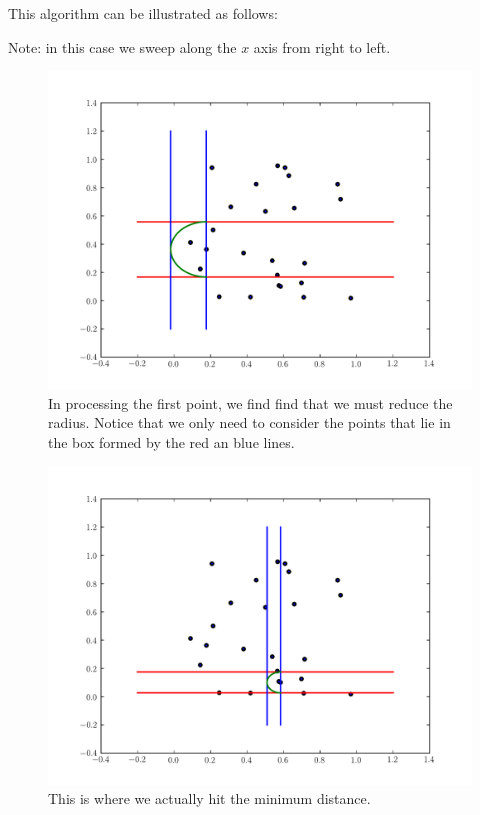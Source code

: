 This algorithm can be illustrated as follows:

Note: in this case we sweep along the $x$ axis from right to left.

\begin{figure}[H]
\includegraphics[width = \textwidth]{sweep0.pdf}
\caption{In processing the first point, we find find that we must reduce the radius.
Notice that we only need to consider the points that lie in the box formed by the red an blue lines.}
\end{figure}

\begin{figure}[H]
\includegraphics[width = \textwidth]{sweep13.pdf}
\caption{This is where we actually hit the minimum distance.}
\end{figure}

